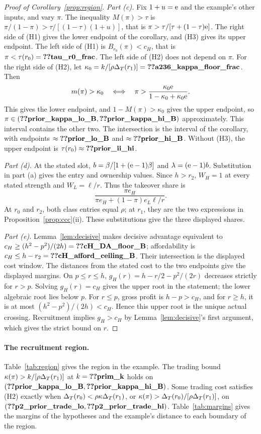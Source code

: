 \begin{proof}[Proof of Corollary~\ref{prop:region}]
\emph{Part (c).} Fix \(1+u=\mathrm{e}\) and the example's other inputs, and vary \(\pi\). The inequality \(M(\pi)>\tau\) is
\(\pi/(1-\pi)>\tau/[(1-\tau)(1+u)]\), that is \(\pi>\tau/[\tau+(1-\tau)\mathrm{e}]\). The right side of (H1) gives the
lower endpoint of the corollary, and (H3) gives its upper endpoint. The left side of (H1) is
\(B_{r_0}(\pi)<c_H\), that is \(\pi<\tau(r_0)=\reg{tau_r0_frac}\). The left side of (H2) does not depend on \(\pi\).
For the right side of (H2), let \(\kappa_0=k/[\rho\DT(r_1)]=\reg{a236_kappa_floor_frac}\). Then
\[
m(\pi)>\kappa_0\quad\Longleftrightarrow\quad
\pi>\frac{\kappa_0\mathrm{e}}{1-\kappa_0+\kappa_0\mathrm{e}}.
\]
This gives the lower endpoint, and \(1-M(\pi)>\kappa_0\) gives the upper endpoint, so
\(\pi\in(\reg{prior_kappa_lo_B},\reg{prior_kappa_hi_B})\)
approximately. This interval contains the other two. The intersection is the interval of the corollary, with
endpoints \(\approx\reg{prior_lo_B}\) and \(\approx\reg{prior_hi_B}\). Without (H3), the upper endpoint is
\(\tau(r_0)\approx\reg{prior_ii_hi}\).

\emph{Part (d).} At the stated slot,
\(b=\beta/[1+(\mathrm{e}-1)\beta]\) and \(\lambda=(\mathrm{e}-1)b\). Substitution in part (a) gives the entry and ownership
values. Since \(h>r_2\), \(W_H=1\) at every stated strength and \(W_L=\ell/r\). Thus the takeover share is
\[
\frac{\pi e_H}{\pi e_H+(1-\pi)e_L\ell/r}.
\]
At \(r_0\) and \(r_2\), both class entries equal \(\rho\); at \(r_1\), they are the two expressions in
Proposition~\ref{prop:ccc}(ii). These substitutions give the three displayed shares.

\emph{Part (e).} Lemma~\ref{lem:decisive} makes decisive advantage equivalent to
\(c_H\ge(h^2-p^2)/(2h)=\reg{cH_DA_floor_B}\); affordability is
\(c_H\le h-r_2=\reg{cH_afford_ceiling_B}\). Their intersection is the displayed cost window.
The distances from the stated cost to the two endpoints give the displayed margins. On \(p\le r\le h\),
\(g_H(r)=h-r/2-p^2/(2r)\) decreases strictly for \(r>p\).
Solving \(g_H(r)=c_H\) gives the upper root in the statement; the lower algebraic root lies below \(p\).
For \(r\le p\), gross profit is \(h-p>c_H\), and for \(r\ge h\), it is at most
\((h^2-p^2)/(2h)<c_H\). Hence this upper root is the unique actual crossing.
Recruitment implies \(g_H>c_H\) by Lemma~\ref{lem:decisive}'s first argument, which gives the strict bound on \(r\).
\end{proof}

\paragraph{The recruitment region.}
Table~\ref{tab:region} gives the region in the example. The trading bound
\(\kappa(\pi)>k/[\rho\Delta_T(r_1)]\) at \(k=\reg{prim_k}\) holds on
\((\reg{prior_kappa_lo_B},\reg{prior_kappa_hi_B})\). Some trading cost satisfies (H2) exactly when
\(\Delta_T(r_0)<\rho\kappa\Delta_T(r_1)\), or \(\kappa(\pi)>\Delta_T(r_0)/[\rho\Delta_T(r_1)]\), on
\((\reg{p2_prior_trade_lo},\reg{p2_prior_trade_hi})\). Table~\ref{tab:margins} gives the margins of the hypotheses and the example's
distance to each boundary of the region.
